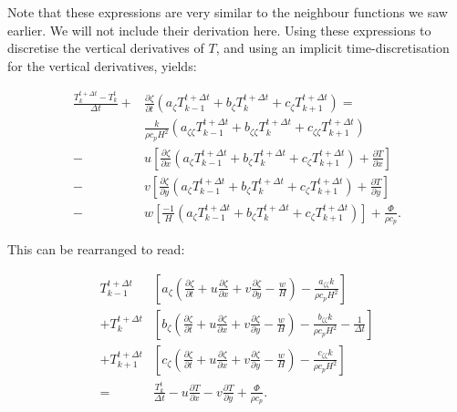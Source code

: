\documentclass{article}
\begin{document}
Note that these expressions are very similar to the neighbour functions we saw earlier. We will not include their derivation here. Using these expressions to discretise the vertical derivatives of $T$, and using an implicit time-discretisation for the vertical derivatives, yields:

\begin{equation}
\begin{split}
\frac{T_k^{t + \Delta t} - T_k^t}{\Delta t} + & \frac{\partial \zeta}{\partial t} 
\left( a_{\zeta} T_{k-1}^{t+\Delta t} + b_{\zeta} T_k^{t+\Delta t} + c_{\zeta} T_{k+1}^{t+\Delta t} \right) = \\
& \frac{k}{\rho c_p H^2} \left( a_{\zeta \zeta} T_{k-1}^{t+\Delta t} + b_{\zeta \zeta} T_k^{t+\Delta t} + c_{\zeta \zeta} T_{k+1}^{t+\Delta t} \right) \\
- & u \left[ \frac{\partial \zeta}{\partial x} \left( a_{\zeta} T_{k-1}^{t+\Delta t} + b_{\zeta} T_k^{t+\Delta t} + c_{\zeta} T_{k+1}^{t+\Delta t} \right) + \frac{\partial T}{\partial x} \right] \\
- & v \left[ \frac{\partial \zeta}{\partial y} \left( a_{\zeta} T_{k-1}^{t+\Delta t} + b_{\zeta} T_k^{t+\Delta t} + c_{\zeta} T_{k+1}^{t+\Delta t} \right) + \frac{\partial T}{\partial y} \right] \\
- & w \left[ \frac{-1}{H} \left( a_{\zeta} T_{k-1}^{t+\Delta t} + b_{\zeta} T_k^{t+\Delta t} + c_{\zeta} T_{k+1}^{t+\Delta t} \right) \right]
+ \frac{\Phi}{\rho c_p}.
\end{split}
\end{equation}

This can be rearranged to read:

\begin{equation}
\begin{split}
T_{k-1}^{t+\Delta t} & \left[ a_{\zeta} \left( \frac{\partial \zeta}{\partial t} + u \frac{\partial \zeta}{\partial x} + v \frac{\partial \zeta}{\partial y} - \frac{w}{H} \right) - \frac{a_{\zeta \zeta} k}{\rho c_p H^2} \right] \\
+ T_k^{t+\Delta t} & \left[ b_{\zeta} \left( \frac{\partial \zeta}{\partial t} + u \frac{\partial \zeta}{\partial x} + v \frac{\partial \zeta}{\partial y} - \frac{w}{H} \right) - \frac{b_{\zeta \zeta} k}{\rho c_p H^2} - \frac{1}{\Delta t} \right] \\
+ T_{k+1}^{t+\Delta t} & \left[ c_{\zeta} \left( \frac{\partial \zeta}{\partial t} + u \frac{\partial \zeta}{\partial x} + v \frac{\partial \zeta}{\partial y} - \frac{w}{H} \right) - \frac{c_{\zeta \zeta} k}{\rho c_p H^2} \right] \\
= & \frac{T_k^t}{\Delta t} - u \frac{\partial T}{\partial x} - v \frac{\partial T}{\partial y} + \frac{\Phi}{\rho c_p}.
\end{split}
\end{equation}
\end{document}
